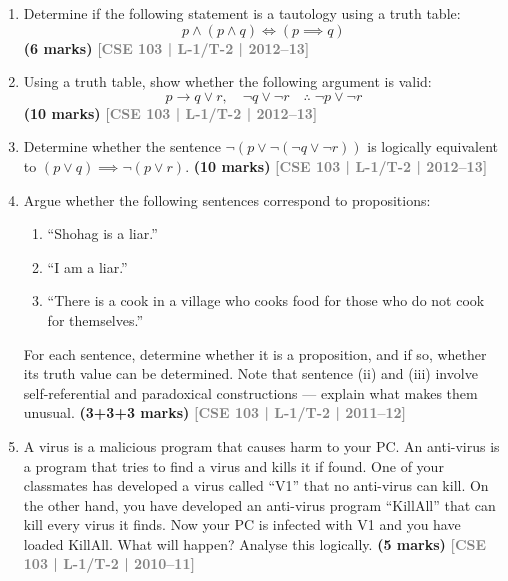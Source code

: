 \documentclass[12pt,a3paper]{article}
\newcommand{\yr}[1]{\hfill\textcolor{gray}{\small\textbf{[#1]}}}
\newcommand{\mk}[1]{\textcolor{orange!70!black}{\small\textbf{(#1 marks)}}}
\begin{document}
\begin{enumerate}
\begin{minipage}{\textwidth}
    \end{minipage}

    \vspace{0.6cm}
    \noindent (Show details of logical reasoning \& rules).
\mk{15} \yr{CSE 103 | L-1/T-2 | 2013--14}  



\item Determine if the following statement is a tautology using a truth table:
\[
  p \land (p \land q) \iff (p \implies q)
\]
\mk{6} \yr{CSE 103 | L-1/T-2 | 2012--13}

\item Using a truth table, show whether the following argument is valid:
\[
  p \to q \lor r, \quad \lnot q \lor \lnot r \quad \therefore\; \lnot p \lor \lnot r
\]
\mk{10} \yr{CSE 103 | L-1/T-2 | 2012--13}

\item Determine whether the sentence $\lnot(p \lor \lnot(\lnot q \lor \lnot r))$ is logically equivalent to $(p \lor q) \implies \lnot(p \lor r)$.
\mk{10} \yr{CSE 103 | L-1/T-2 | 2012--13}

\item Argue whether the following sentences correspond to propositions:
\begin{enumerate}
  \item ``Shohag is a liar.''
  \item ``I am a liar.''
  \item ``There is a cook in a village who cooks food for those who do not cook for themselves.''
\end{enumerate}
For each sentence, determine whether it is a proposition, and if so, whether its truth value can be determined. Note that sentence (ii) and (iii) involve self-referential and paradoxical constructions — explain what makes them unusual.
\mk{3+3+3} \yr{CSE 103 | L-1/T-2 | 2011--12}

\item A virus is a malicious program that causes harm to your PC. An anti-virus is a program that tries to find a virus and kills it if found. One of your classmates has developed a virus called ``V1'' that no anti-virus can kill. On the other hand, you have developed an anti-virus program ``KillAll'' that can kill every virus it finds. Now your PC is infected with V1 and you have loaded KillAll. What will happen? Analyse this logically.
\mk{5} \yr{CSE 103 | L-1/T-2 | 2010--11}


\end{enumerate}
\end{document}
